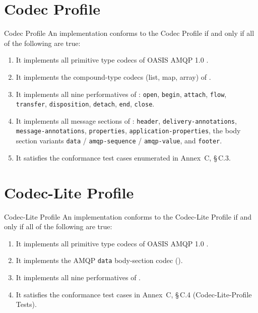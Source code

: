 \documentclass{../styles/zerodds-vendor-spec}
\begin{document}
\section{Codec Profile}\label{sec:profile-codec}

\begin{conformance}{Codec Profile}
An implementation conforms to the Codec Profile if and only if all
of the following are true:
\begin{enumerate}
  \item It implements all primitive type codecs of OASIS AMQP 1.0
        .
  \item It implements the compound-type codecs (list, map, array)
        of .
  \item It implements all nine performatives of
        : \texttt{open},
        \texttt{begin}, \texttt{attach}, \texttt{flow},
        \texttt{transfer}, \texttt{disposition}, \texttt{detach},
        \texttt{end}, \texttt{close}.
  \item It implements all message sections of
        : \texttt{header},
        \texttt{delivery-annotations}, \texttt{message-annotations},
        \texttt{properties}, \texttt{application-properties}, the
        body section variants \texttt{data} / \texttt{amqp-sequence}
        / \texttt{amqp-value}, and \texttt{footer}.
  \item It satisfies the conformance test cases enumerated in
        Annex~C, \S\,C.3.
\end{enumerate}
\end{conformance}

\section{Codec-Lite Profile}\label{sec:profile-codec-lite}

\begin{conformance}{Codec-Lite Profile}
An implementation conforms to the Codec-Lite Profile if and only
if all of the following are true:
\begin{enumerate}
  \item It implements all primitive type codecs of OASIS AMQP 1.0
        .
  \item It implements the AMQP \texttt{data} body-section codec
        ().
  \item It implements all nine performatives of
        .
  \item It satisfies the conformance test cases in Annex~C,
        \S\,C.4 (Codec-Lite-Profile Tests).
\end{enumerate}
\end{conformance}
\end{document}
